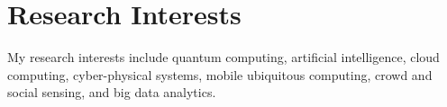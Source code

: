 
\section{\sc Research Interests}

My research interests include quantum computing, artificial intelligence, cloud computing, cyber-physical systems, mobile ubiquitous computing, crowd and social sensing, and big data analytics.



